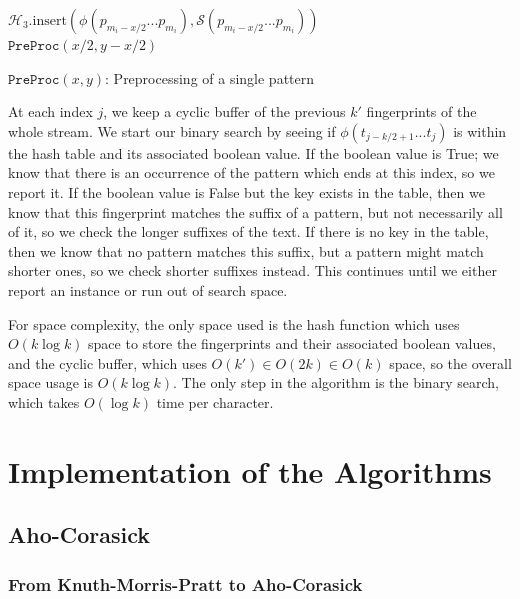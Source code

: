 \documentclass[ %
                    author={Dominic Joseph Moylett},
                    degree={MEng},
                     title={Dictionary Matching with Fingerprints},
                  subtitle={An Empirical Analysis},
                      type={research},
                      year={2015} ]{dissertation}
\begin{document}
\begin{algorithm}[t]
 {
  $\mathcal{H}_3.\text{insert}(\phi(p_{m_i-x/2}...p_{m_i}), \mathcal{S}(p_{m_i-x/2}...p_{m_i}))$\\
  $\texttt{PreProc}(x/2,y - x/2)$
}
\caption{$\texttt{PreProc}(x,y)$: Preprocessing of a single pattern}
\label{alg:short-dict-matching}
\end{algorithm}

At each index $j$, we keep a cyclic buffer of the previous $k'$ fingerprints of the whole stream. We start our binary search by seeing if $\phi(t_{j - k/2 + 1}...t_j)$ is within the hash table and its associated boolean value. If the boolean value is True; we know that there is an occurrence of the pattern which ends at this index, so we report it. If the boolean value is False but the key exists in the table, then we know that this fingerprint matches the suffix of a pattern, but not necessarily all of it, so we check the longer suffixes of the text. If there is no key in the table, then we know that no pattern matches this suffix, but a pattern might match shorter ones, so we check shorter suffixes instead. This continues until we either report an instance or run out of search space.

For space complexity, the only space used is the hash function which uses $O(k\log k)$ space to store the fingerprints and their associated boolean values, and the cyclic buffer, which uses $O(k') \in O(2k) \in O(k)$ space, so the overall space usage is $O(k\log k)$. The only step in the algorithm is the binary search, which takes $O(\log k)$ time per character.


\chapter{Implementation of the Algorithms}
\label{chap:execution}

\section{Aho-Corasick}

\subsection{From Knuth-Morris-Pratt to Aho-Corasick}
\end{document}
